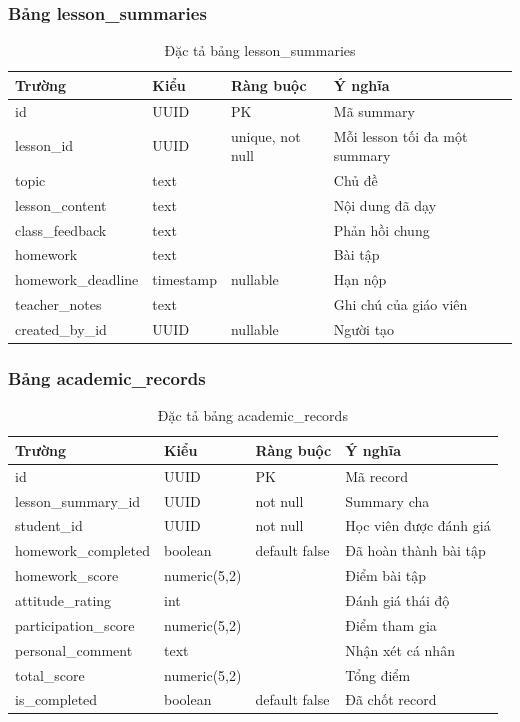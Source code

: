 \documentclass[../DoAn.tex]{subfiles}
\begin{document}
\subsubsection{Bảng lesson\_summaries}
\begin{table}[H]
\centering
\caption{Đặc tả bảng lesson\_summaries}
\scriptsize
\begin{tabular}{|l|l|l|p{4cm}|}
\hline
\textbf{Trường} & \textbf{Kiểu} & \textbf{Ràng buộc} & \textbf{Ý nghĩa} \\ \hline
id & UUID & PK & Mã summary \\ \hline
lesson\_id & UUID & unique, not null & Mỗi lesson tối đa một summary \\ \hline
topic & text & & Chủ đề \\ \hline
lesson\_content & text & & Nội dung đã dạy \\ \hline
class\_feedback & text & & Phản hồi chung \\ \hline
homework & text & & Bài tập \\ \hline
homework\_deadline & timestamp & nullable & Hạn nộp \\ \hline
teacher\_notes & text & & Ghi chú của giáo viên \\ \hline
created\_by\_id & UUID & nullable & Người tạo \\ \hline
\end{tabular}
\end{table}

\subsubsection{Bảng academic\_records}
\begin{table}[H]
\centering
\caption{Đặc tả bảng academic\_records}
\scriptsize
\begin{tabular}{|l|l|p{3cm}|p{3.5cm}|}
\hline
\textbf{Trường} & \textbf{Kiểu} & \textbf{Ràng buộc} & \textbf{Ý nghĩa} \\ \hline
id & UUID & PK & Mã record \\ \hline
lesson\_summary\_id & UUID & not null & Summary cha \\ \hline
student\_id & UUID & not null & Học viên được đánh giá \\ \hline
homework\_completed & boolean & default false & Đã hoàn thành bài tập \\ \hline
homework\_score & numeric(5,2) & & Điểm bài tập \\ \hline
attitude\_rating & int & & Đánh giá thái độ \\ \hline
participation\_score & numeric(5,2) & & Điểm tham gia \\ \hline
personal\_comment & text & & Nhận xét cá nhân \\ \hline
total\_score & numeric(5,2) & & Tổng điểm \\ \hline
is\_completed & boolean & default false & Đã chốt record \\ \hline
\end{tabular}
\end{table}
\end{document}
